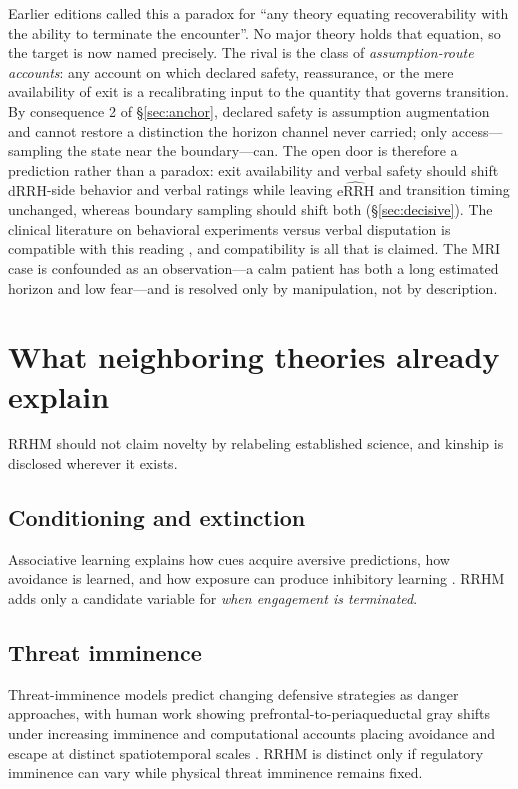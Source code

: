 \documentclass[9pt,twocolumn]{article}
\newcommand{\dRRH}{\mathrm{dRRH}}
\newcommand{\eRRHhat}{\widehat{\mathrm{eRRH}}}
\begin{document}
Earlier editions called this a paradox for ``any theory equating recoverability with the ability to terminate the encounter''. No major theory holds that equation, so the target is now named precisely. The rival is the class of \emph{assumption-route accounts}: any account on which declared safety, reassurance, or the mere availability of exit is a recalibrating input to the quantity that governs transition. By consequence 2 of \S\ref{sec:anchor}, declared safety is assumption augmentation and cannot restore a distinction the horizon channel never carried; only access---sampling the state near the boundary---can. The open door is therefore a prediction rather than a paradox: exit availability and verbal safety should shift $\dRRH$-side behavior and verbal ratings while leaving $\eRRHhat$ and transition timing unchanged, whereas boundary sampling should shift both (\S\ref{sec:decisive}). The clinical literature on behavioral experiments versus verbal disputation is compatible with this reading \cite{bennettlevy2004}, and compatibility is all that is claimed. The MRI case is confounded as an observation---a calm patient has both a long estimated horizon and low fear---and is resolved only by manipulation, not by description.

\section{What neighboring theories already explain}
RRHM should not claim novelty by relabeling established science, and kinship is disclosed wherever it exists.

\subsection{Conditioning and extinction}
Associative learning explains how cues acquire aversive predictions, how avoidance is learned, and how exposure can produce inhibitory learning \cite{krypotos2015,pittig2018,kausche2025,craske2014}. RRHM adds only a candidate variable for \emph{when engagement is terminated}.

\subsection{Threat imminence}
Threat-imminence models predict changing defensive strategies as danger approaches, with human work showing prefrontal-to-periaqueductal gray shifts under increasing imminence and computational accounts placing avoidance and escape at distinct spatiotemporal scales \cite{mobbs2007,mobbs2020}. RRHM is distinct only if regulatory imminence can vary while physical threat imminence remains fixed.
\end{document}
